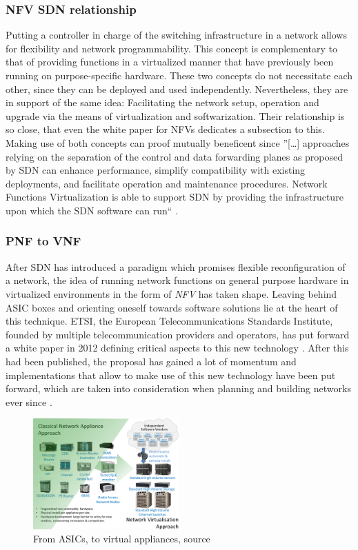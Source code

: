 \subsubsection{NFV SDN relationship}
Putting a controller in charge of the switching infrastructure in a network allows for flexibility and network programmability. This concept is complementary to that of providing functions in a virtualized manner that have previously been running on purpose-specific hardware. These two concepts do not necessitate each other, since they can be deployed and used independently. Nevertheless, they are in support of the same idea: Facilitating the network setup, operation and upgrade via the means of virtualization and softwarization. Their relationship is so close, that even the white paper for NFVs dedicates a subsection to this. Making use of both concepts can proof mutually beneficent since ''[\dots] approaches relying on the separation of the control and data forwarding planes as proposed by SDN can enhance performance, simplify compatibility with existing deployments, and facilitate operation and maintenance procedures. Network Functions Virtualization is able to support SDN by providing the infrastructure upon which the SDN software can run`` \cite{nfv_wp}. 


\subsubsection{PNF to VNF}
After SDN has introduced a paradigm which promises flexible reconfiguration of a network, the idea of running network functions on general purpose hardware in virtualized environments in the form of \textit{NFV} has taken shape. Leaving behind ASIC boxes and orienting oneself towards software solutions lie at the heart of this technique. ETSI, the European Telecommunications Standards Institute, founded by multiple telecommunication providers and operators, has put forward a white paper in 2012 defining critical aspects to this new technology \cite{nfv_wp}. After this had been published, the proposal has gained a lot of momentum and implementations that allow to make use of this new technology have been put forward, which are taken into consideration when planning and building networks ever since \cite{ordonez2017network}.

\begin{figure}[h]
	\centering
	\includegraphics[width=0.5\textwidth]{images/nfv.png}
	\caption{From ASICs, to virtual appliances, source \cite{nfv_wp}}
	\label{img:nfv_wp}
\end{figure}

